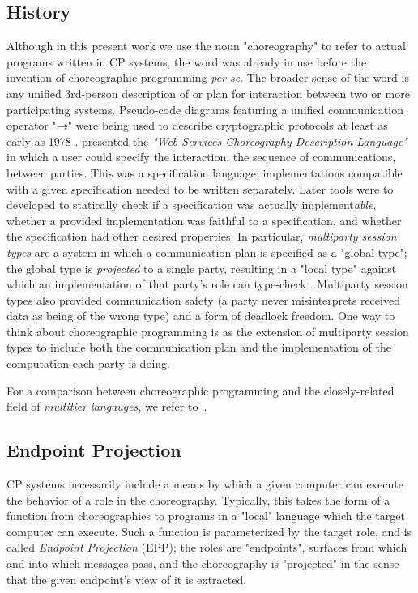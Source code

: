 \subsection{History}
\label{sec:history}
Although in this present work we use the noun "choreography" to refer to actual programs written in CP systems,
the word was already in use before the invention of choreographic programming \textit{per se}.
The broader sense of the word is any unified 3rd-person description of or plan for interaction between two or more participating systems.
Pseudo-code diagrams featuring a unified communication operator "→"
were being used to describe cryptographic protocols at least as early as 1978 \cite{needham_schroeder_1978}.
\cite{w3c2005} presented the \emph{"Web Services Choreography Description Language"}
in which a user could specify the interaction, the sequence of communications, between parties.
This was a specification language; implementations compatible with a given specification needed to be written separately.
Later tools were to developed to statically check if a specification was actually implement\emph{able},
whether a provided implementation was faithful to a specification,
and whether the specification had other desired properties.
In particular, \emph{multiparty session types} are a system in which a communication plan is specified as a "global type";
the global type is \emph{projected} to a single party,
resulting in a "local type" against which an implementation of that party's role can type-check
\cite{honda-mpsts}.
Multiparty session types also provided communication safety (\eg a party never misinterprets received data as being of the wrong type)
and a form of deadlock freedom.
One way to think about choreographic programming is as the extension of multiparty session types to include
both the communication plan and the implementation of the computation each party is doing.

For a comparison between choreographic programming and the closely-related field of \emph{multitier langauges}, we refer to~\cite{multiparty-languages}.

\subsection{Endpoint Projection}
\label{sec:endpoint-projection}
CP systems necessarily include a means by which a given computer can execute the behavior of a role in the choreography.
Typically, this takes the form of a function from choreographies to programs in a "local" language
which the target computer can execute.
Such a function is parameterized by the target role, and is called \emph{Endpoint Projection} (EPP);
the roles are "endpoints", \ie surfaces from which and into which messages pass,
and the choreography is "projected" in the sense that the given endpoint's view of it is extracted.

